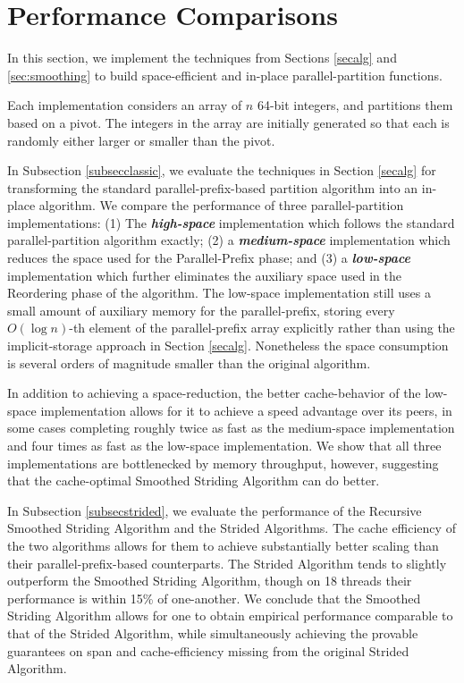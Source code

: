 \documentclass[sigplan, 10pt, nonacm]{acmart}
\newcommand{\defn}[1]{{\textit{\textbf{\boldmath #1}}}}
\theoremstyle{remark}
\theoremstyle{remark}
\begin{document}

\section{Performance Comparisons}\label{secexp}

In this section, we implement the techniques from Sections
\ref{secalg} and \ref{sec:smoothing} to build space-efficient and
in-place parallel-partition functions.


Each implementation considers an array of $n$ 64-bit integers, and
partitions them based on a pivot. The integers in the array are
initially generated so that each is randomly either larger or smaller
than the pivot.

In Subsection \ref{subsecclassic}, we evaluate the techniques in
Section \ref{secalg} for transforming the standard
parallel-prefix-based partition algorithm into an in-place
algorithm. We compare the performance of three parallel-partition
implementations: (1) The \defn{high-space} implementation which
follows the standard parallel-partition algorithm exactly; (2) a
\defn{medium-space} implementation which reduces the space used for
the Parallel-Prefix phase; and (3) a \defn{low-space} implementation
which further eliminates the auxiliary space used in the Reordering
phase of the algorithm. The low-space implementation still uses a
small amount of auxiliary memory for the parallel-prefix, storing
every $O(\log n)$-th element of the parallel-prefix array explicitly
rather than using the implicit-storage approach in Section
\ref{secalg}. Nonetheless the space consumption is several orders of
magnitude smaller than the original algorithm.

In addition to achieving a space-reduction, the better cache-behavior
of the low-space implementation allows for it to achieve a speed
advantage over its peers, in some cases completing roughly twice as
fast as the medium-space implementation and four times as fast as the
low-space implementation. We show that all three implementations are
bottlenecked by memory throughput, however, suggesting that the cache-optimal Smoothed Striding Algorithm can do better.

In Subsection \ref{subsecstrided}, we evaluate the performance of the
Recursive Smoothed Striding Algorithm and the Strided Algorithms. The
cache efficiency of the two algorithms allows for them to achieve
substantially better scaling than their parallel-prefix-based
counterparts. The Strided Algorithm tends to slightly outperform the
Smoothed Striding Algorithm, though on 18 threads their performance is
within 15\% of one-another. We conclude that the Smoothed Striding
Algorithm allows for one to obtain empirical performance comparable to
that of the Strided Algorithm, while simultaneously achieving the
provable guarantees on span and cache-efficiency missing from the
original Strided Algorithm.
\end{document}
